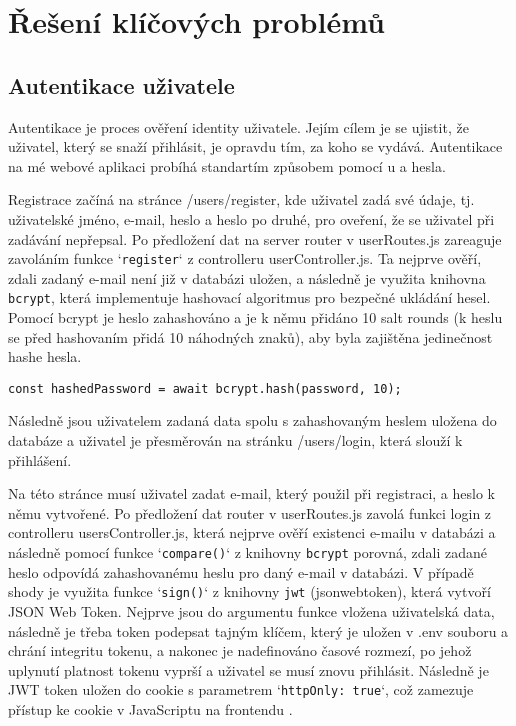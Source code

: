 \section{Řešení klíčových problémů}

\subsection{Autentikace uživatele}

\par Autentikace je proces ověření identity uživatele. Jejím cílem je se ujistit, že uživatel, který se snaží přihlásit, je opravdu tím, za koho se vydává. Autentikace na mé webové aplikaci probíhá standartím způsobem pomocí u a hesla.
\par Registrace začíná na stránce /users/register, kde uživatel zadá své údaje, tj. uživatelské jméno, e-mail, heslo a heslo po druhé, pro oveření, že se uživatel při zadávání nepřepsal. Po předložení dat na server router v userRoutes.js zareaguje zavoláním funkce `\texttt{register}` z controlleru userController.js. Ta nejprve ověří, zdali zadaný e-mail není již v databázi uložen, a následně je využita knihovna \texttt{bcrypt}, která implementuje hashovací algoritmus pro bezpečné ukládání hesel. Pomocí bcrypt je heslo zahashováno a je k němu přidáno 10 salt rounds (k heslu se před hashovaním přidá 10 náhodných znaků), aby byla zajištěna jedinečnost hashe hesla. 
\begin{lstlisting}[caption = {Hashování hesla se solí},label = {lst:stranka}]
const hashedPassword = await bcrypt.hash(password, 10);
\end{lstlisting}
Následně jsou uživatelem zadaná data spolu s zahashovaným heslem uložena do databáze a uživatel je přesměrován na stránku /users/login, která slouží k přihlášení.
\par Na této stránce musí uživatel zadat e-mail, který použil při registraci, a heslo k němu vytvořené. Po předložení dat router v userRoutes.js zavolá funkci login z controlleru usersController.js, která nejprve ověří existenci e-mailu v databázi a následně pomocí funkce `\texttt{compare()}` z knihovny \texttt{bcrypt} porovná, zdali zadané heslo odpovídá zahashovanému heslu pro daný e-mail v databázi. V případě shody je využita funkce `\texttt{sign()}` z knihovny \texttt{jwt} (jsonwebtoken), která vytvoří JSON Web Token. Nejprve jsou do argumentu funkce vložena uživatelská data, následně je třeba token podepsat tajným klíčem, který je uložen v .env souboru a chrání integritu tokenu, a nakonec je nadefinováno časové rozmezí, po jehož uplynutí platnost tokenu vyprší a uživatel se musí znovu přihlásit. Následně je JWT token uložen do cookie s parametrem `\texttt{httpOnly: true}`, což zamezuje přístup ke cookie v JavaScriptu na frontendu \cite{jwt_auth_tutorial}\cite{nodejs_jwt_mongodb}. 
